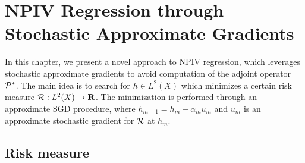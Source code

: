 \chapter{NPIV Regression through Stochastic Approximate Gradients}
\label{chap: sagdiv}

In this chapter, we present a novel approach to NPIV regression, which leverages stochastic approximate gradients to avoid computation of the adjoint operator $ \mathcal{P}^{ * } $.
The main idea is to search for $ h \in L^2 ( X ) $ which minimizes a certain risk measure $ \mathcal{R} : L^2 ( X ) \to \mathbf{R} $.
The minimization is performed through an approximate SGD procedure, where $ h_{ m + 1 } = h_{ m } - \alpha_{ m } u_{ m } $ and $ u_{ m } $ is an approximate stochastic gradient for $ \mathcal{R} $ at $ h_{ m } $.

\section{Risk measure}

